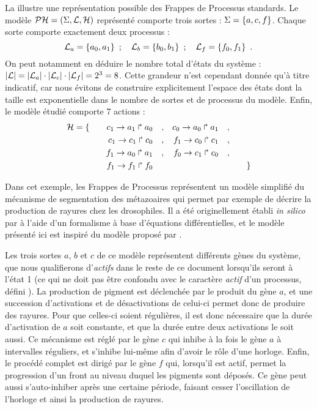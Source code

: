 \begin{example}
  La  illustre une représentation possible des
  Frappes de Processus standards.
  Le modèle $\mathcal{PH} = (\Sigma, \mathcal{L}, \mathcal{H})$ représenté comporte trois sortes :
  $\Sigma = \{ a, c, f \}$.
  Chaque sorte comporte exactement deux processus :
  \[\mathcal{L}_a = \{ a_0, a_1 \} \enspace;\quad
    \mathcal{L}_b = \{ b_0, b_1 \} \enspace;\quad
    \mathcal{L}_f = \{ f_0, f_1 \} \enspace.\]
  On peut notamment en déduire le nombre total d'états du système :
  $|\mathcal{L}| = |\mathcal{L}_a| \cdot |\mathcal{L}_c| \cdot |\mathcal{L}_f| = 2^3 = 8$.
  Cette grandeur n'est cependant donnée qu'à titre indicatif,
  car nous évitons de construire explicitement l'espace des états
  dont la taille est exponentielle dans le nombre de sortes et de processus du modèle.
  Enfin, le modèle étudié comporte 7 actions :
  \begin{align*}
    \mathcal{H} = \{\qquad
      c_1\rightarrow a_1\Rsh a_0\quad, && c_0\rightarrow a_0\Rsh a_1\quad,& \\
      c_1\rightarrow c_1\Rsh c_0\quad, && f_1\rightarrow c_0\Rsh c_1\quad,& \\
      f_1\rightarrow a_0\Rsh a_1\quad, && f_0\rightarrow c_1\Rsh c_0\quad,& \\
      f_1\rightarrow f_1\Rsh f_0\quad\; &&& 
    \qquad\}
  \end{align*}
  
  Dans cet exemple,
  les Frappes de Processus représentent un modèle simplifié du mécanisme
  de segmentation des métazoaires qui permet par exemple de décrire la production de rayures
  chez les drosophiles.
  Il a été originellement établi \textit{in silico} par 
  à l'aide d'un formalisme à base d'équations différentielles,
  et le modèle présenté ici est inspiré du modèle proposé par .
  
  Les trois sortes $a$, $b$ et $c$ de ce modèle représentent différents gènes du système,
  que nous qualifierons d'\emph{actifs} dans le reste de ce document lorsqu'ils seront à l'état 1
  (ce qui ne doit pas être confondu avec le caractère \emph{actif} d'un processus,
  défini ).
  La production de pigment est déclenchée par le produit du gène $a$,
  et une succession d'activations et de désactivations
  de celui-ci permet donc de produire des rayures.
  Pour que celles-ci soient régulières, il est donc nécessaire que la durée d'activation
  de $a$ soit constante, et que la durée entre deux activations le soit aussi.
  Ce mécanisme est réglé par le gène $c$ qui inhibe à la fois le gène $a$ à intervalles réguliers,
  et s'inhibe lui-même afin d'avoir le rôle d'une horloge.
  Enfin, le procédé complet est dirigé par le gène $f$ qui, lorsqu'il est actif,
  permet la progression d'un front au niveau duquel les pigments sont déposés.
  Ce gène peut aussi s'auto-inhiber après une certaine période, faisant cesser
  l'oscillation de l'horloge et ainsi la production de rayures.
  

\end{example}

